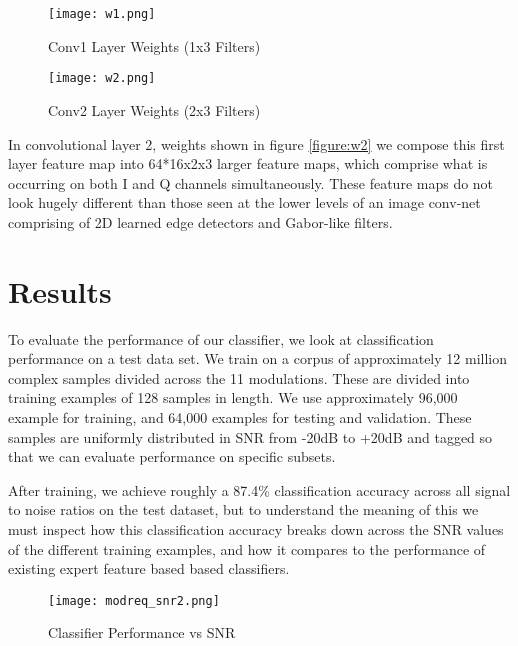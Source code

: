 \documentclass[runningheads,a4paper]{llncs}
\begin{document}
\begin{figure}[ht]
\centering
\begin{minipage}[b]{0.45\linewidth}
      \texttt{[image: w1.png]}
  \caption{Conv1 Layer Weights (1x3 Filters)}
  \label{figure:w1}
\end{minipage}
\quad
\begin{minipage}[b]{0.45\linewidth}
      \texttt{[image: w2.png]}
  \caption{Conv2 Layer Weights (2x3 Filters)}\label{figure:w2}
\label{fig:minipage2}
\end{minipage}
\end{figure}

In convolutional layer 2, weights shown in figure \ref{figure:w2} we compose this first layer feature map into 64*16x2x3 larger feature maps, which comprise what is occurring on both I and Q channels simultaneously.  These feature maps do not look hugely different than those seen at the lower levels of an image conv-net comprising of 2D learned edge detectors and Gabor-like filters.   

\section{Results}

To evaluate the performance of our classifier, we look at classification performance on a test data set.  We train on a corpus of approximately 12 million complex samples divided across the 11 modulations.  These are divided into training examples of 128 samples in length.   We use approximately 96,000 example for training, and 64,000 examples for testing and validation.   These samples are uniformly distributed in SNR from -20dB to +20dB and tagged so that we can evaluate performance on specific subsets.

After training, we achieve roughly a 87.4\% classification accuracy across all signal to noise ratios on the test dataset, but to understand the meaning of this we must inspect how this classification accuracy breaks down across the SNR values of the different training examples, and how it compares to the performance of existing expert feature based based classifiers.

\begin{figure}[ht!]
  \centering
      \texttt{[image: modreq\_snr2.png]}
  \caption{Classifier Performance vs SNR} \label{figure:modreq_snr}
\end{figure}
\end{document}
